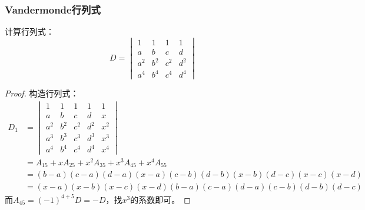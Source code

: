 \subsubsection{Vandermonde行列式}
\begin{theorem}
	计算行列式：
	\begin{equation*}
		D=
		\begin{vmatrix}
			1 & 1 & 1 & 1 \\
			a & b & c & d \\
			a^2 & b^2 & c^2 & d^2 \\
			a^4 & b^4 & c^4 & d^4
		\end{vmatrix}
	\end{equation*}
\end{theorem}
\begin{proof}
	构造行列式：
	\begin{align*}
		D_1&=
		\begin{vmatrix}
			1 & 1 & 1 & 1 & 1\\
			a & b & c & d & x\\
			a^2 & b^2 & c^2 & d^2 & x^2 \\
			a^3 & b^3 & c^3 & d^3 & x^3 \\
			a^4 & b^4 & c^4 & d^4 & x^4
		\end{vmatrix} \\
		&=A_{15}+xA_{25}+x^2A_{35}+x^3A_{45}+x^4A_{55} \\
		&=(b-a)(c-a)(d-a)(x-a)(c-b)(d-b)(x-b)(d-c)(x-c)(x-d) \\
		&=(x-a)(x-b)(x-c)(x-d)(b-a)(c-a)(d-a)(c-b)(d-b)(d-c)
	\end{align*}
	而$A_{45}=(-1)^{4+5}D=-D$，找$x^3$的系数即可。
\end{proof}

